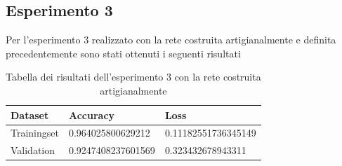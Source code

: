 \subsection{Esperimento 3}
Per l'esperimento 3 realizzato con la rete costruita artigianalmente e definita precedentemente sono stati ottenuti i seguenti risultati

\begin{table}[H]
    \begin{tabular}{|l|l|l|}
    \hline
    \textbf{Dataset}     & \textbf{Accuracy}           & \textbf{Loss}                 \\ \hline
    Trainingset & 0.964025800629212 & 0.11182551736345149 \\ \hline
    Validation  & 0.9247408237601569 & 0.323432678943311  \\ \hline
    \end{tabular}
   	\caption{\label{tab:esperimento3_risultati}Tabella dei risultati dell'esperimento 3 con la rete costruita artigianalmente}
\end{table}

